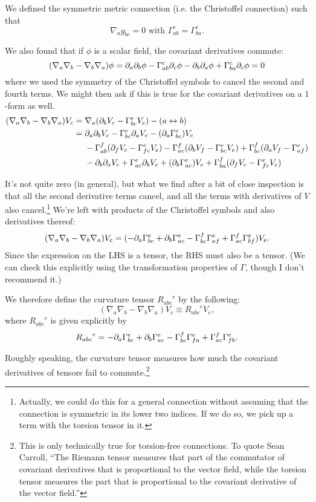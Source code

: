 We defined the symmetric metric connection (i.e. the Christoffel connection) such that
$$\nabla_a g_{bc}=0\text{ with } \Gamma^c_{ab}=\Gamma^{c}_{ba}.$$

We also found that if $\phi$ is a scalar field, the covariant derivatives commute:
$$(\nabla_a \nabla_b - \nabla_b \nabla_a)\phi = \partial_a \partial_b \phi - \Gamma^c_{ab} \partial_c \phi - \partial_b \partial_a \phi+ \Gamma^c_{ba}\partial_c\phi =0$$
where we used the symmetry of the Christoffel symbols to cancel the second and fourth terms.
We might then ask if this is true for the covariant derivatives on a $1$-form as well.
\begin{align*}
(\nabla_a \nabla_b - \nabla_b \nabla_a)V_c ={}&
\nabla_a(\partial_b V_c - \Gamma^e_{bc} V_e) - (a\leftrightarrow b)\\
={}&\partial_a\partial_b V_c - \Gamma^e_{bc} \partial_a V_e - (\partial_a \Gamma^e_{bc})V_e \\
&- \Gamma^f_{ab} (\partial_f V_c- \Gamma^e_{fc} V_e) -\Gamma^f_{ac}(\partial_b V_f - \Gamma^e_{bc}V_e) +\Gamma^f_{bc}(\partial_a V_f -\Gamma^e_{af})\\
&-\partial_b\partial_a V_c + \Gamma^e_{ac}\partial_b V_e + (\partial_b \Gamma^e_{ac})V_e +\Gamma^f_{ba}(\partial_f V_c - \Gamma^e_{fc} V_e)
\end{align*}

It's not quite zero (in general), but what we find after a bit of close inspection is that all the second derivative terms cancel, and all the terms with derivatives of $V$ also cancel.\footnote{Actually, we could do this for a general connection without assuming that the connection is symmetric in its lower two indices. If we do so, we pick up a term with the torsion tensor in it.} We're left with products of the Christoffel symbols and also derivatives thereof:
$$(\nabla_a\nabla_b - \nabla_b \nabla_a)V_c=(-\partial_a \Gamma^e_{bc}+\partial_b \Gamma^e_{ac} - \Gamma^f_{bc} \Gamma^e_{af}+\Gamma^f_{ac} \Gamma^e_{bf}) V_e.$$
Since the expression on the LHS is a tensor, the RHS must also be a tensor. (We can check this explicitly using the transformation properties of $\Gamma$, though I don't recommend it.)

\begin{defn}
We therefore define the curvature tensor ${R_{abc}}^e$ by the following:
$$(\nabla_a \nabla_b - \nabla_b \nabla_a)V_c\equiv {R_{abc}}^e V_e,$$
where ${R_{abc}}^e$ is given explicitly by
$${R_{abc}}^e = -\partial_a \Gamma^e_{bc} +\partial_b \Gamma^e_{ac}-\Gamma^f_{bc} \Gamma^e_{fa}+\Gamma^f_{ac} \Gamma^e_{fb}.$$

Roughly speaking, the curvature tensor measures how much the covariant derivatives of tensors fail to commute.\footnote{This is only technically true for torsion-free connections. To quote Sean Carroll, ``The Riemann tensor measures that part of the commutator of covariant derivatives that is proportional to the vector field, while the torsion tensor measures the part that is proportional to the covariant derivative of the vector field.''}
\end{defn}

